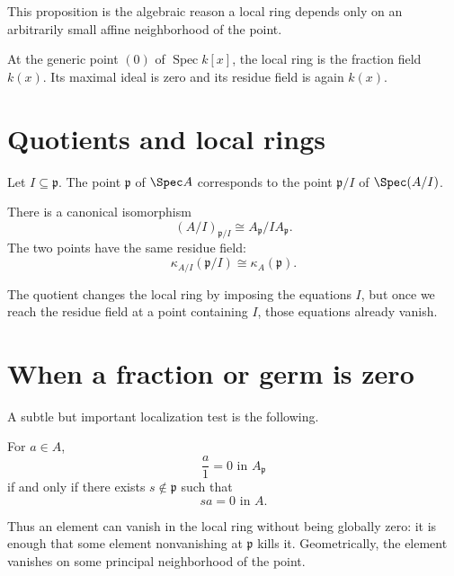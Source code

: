 

This proposition is the algebraic reason a local ring depends only on an arbitrarily small
affine neighborhood of the point.

\begin{example}\label{ex:vi11-expand-02}
At the generic point $(0)$ of $\operatorname{Spec}k[x]$, the local ring is the fraction field $k(x)$.  Its maximal ideal is zero and its residue field is again $k(x)$.
\end{example}
\section{Quotients and local rings}

Let $I\subseteq\mathfrak p$.  The point $\mathfrak p$ of $\Spec A$ corresponds to the
point $\mathfrak p/I$ of $\Spec(A/I)$.

\begin{proposition}
There is a canonical isomorphism
\[
(A/I)_{\mathfrak p/I}
\cong
A_{\mathfrak p}/IA_{\mathfrak p}.
\]
The two points have the same residue field:
\[
\kappa_{A/I}(\mathfrak p/I)
\cong
\kappa_A(\mathfrak p).
\]
\end{proposition}



The quotient changes the local ring by imposing the equations $I$, but once we reach the
residue field at a point containing $I$, those equations already vanish.

\section{When a fraction or germ is zero}

A subtle but important localization test is the following.

\begin{proposition}
For $a\in A$,
\[
\frac{a}{1}=0\text{ in }A_{\mathfrak p}
\]
if and only if there exists $s\notin\mathfrak p$ such that
\[
sa=0\text{ in }A.
\]
\end{proposition}

Thus an element can vanish in the local ring without being globally zero: it is enough that
some element nonvanishing at $\mathfrak p$ kills it.  Geometrically, the element vanishes on
some principal neighborhood of the point.

